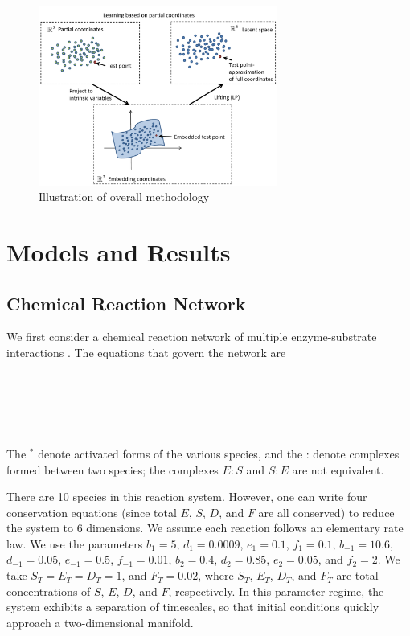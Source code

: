 \documentclass[twocolumn]{revtex4}
\begin{document}
\begin{figure}[ht]
\includegraphics[width=0.7\textwidth]{LapPyr_illustration.pdf}
\caption{Illustration of overall methodology}
\end{figure}

\section{Models and Results} \label{sec:examples}

\subsection{Chemical Reaction Network}

We first consider a chemical reaction network of multiple enzyme-substrate interactions \cite{zagaris2012stability}.
%
The equations that govern the network are\\
\begin{center}
\\
\\
\\
\\
\end{center}

The $^{*}$ denote activated forms of the various species, and the : denote complexes formed between two species; the complexes $E:S$ and $S:E$ are not equivalent.

There are 10 species in this reaction system.
%
However, one can write four conservation equations (since total $E$, $S$, $D$, and $F$ are all conserved) to reduce the system to 6 dimensions.
%
We assume each reaction follows an elementary rate law.
%
We use the parameters $b_1=5$, $d_1=0.0009$, $e_1=0.1$, $f_1=0.1$, $b_{-1} = 10.6$, $d_{-1}=0.05$, $e_{-1}=0.5$, $f_{-1} =0.01$, $b_2=0.4$, $d_2=0.85$, $e_2=0.05$, and $f_2=2$.
%
We take $S_T=E_T=D_T=1$, and $F_T=0.02$, where $S_T$, $E_T$, $D_T$, and $F_T$ are total concentrations of $S$, $E$, $D$, and $F$, respectively.
%
In this parameter regime, the system exhibits a separation of timescales, so that initial conditions quickly approach a two-dimensional manifold.
%
\end{document}

